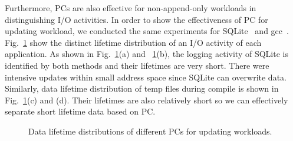 Furthermore, PCs are also effective for non-append-only workloads
in distinguishing I/O activities. 
In order to show the effectiveness of PC for updating workload,
we conducted the same experiments for SQLite~\cite{SQLite} and gcc~\cite{GCC}.
Fig.~\ref{fig:updating_PCs} show the distinct lifetime distribution of an I/O activity 
of each application.
As shown in Fig.~\ref{fig:updating_PCs}(a) and ~\ref{fig:updating_PCs}(b),
the logging activity of SQLite is identified by both methods and 
their lifetimes are very short.
There were intensive updates within small address
space since SQLite can overwrite data.
Similarly, data lifetime distribution of temp files during compile is shown in
Fig.~\ref{fig:updating_PCs}(c) and (d).
Their lifetimes are also relatively short so we can effectively separate
short lifetime data based on PC.


\begin{figure}[t]
\centering
\hfill
	\hspace{2pt}
\hfill
\vspace{7pt}
	\hspace{2pt}
\caption{Data lifetime distributions of different PCs for updating workloads.} 
\label{fig:updating_PCs}
\end{figure}


